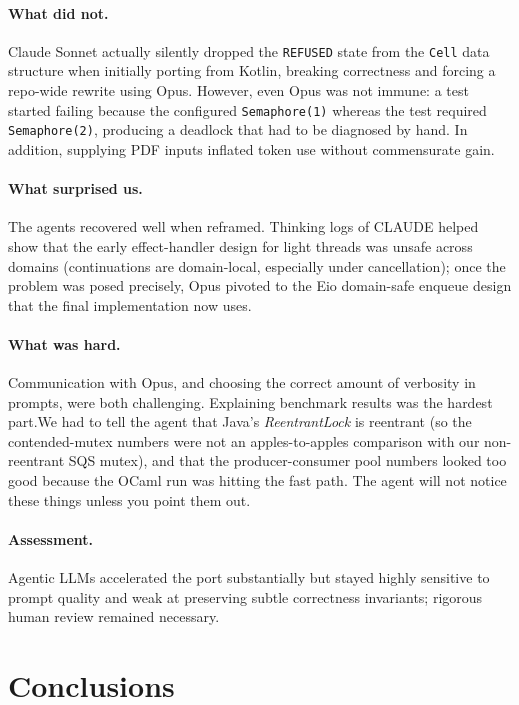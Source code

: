 \documentclass[11pt,a4paper]{article}
\begin{document}
\paragraph{What did not.} Claude Sonnet actually silently dropped the
\texttt{REFUSED} state from the \texttt{Cell} data structure when initially
porting from Kotlin, breaking correctness and forcing a repo-wide rewrite using
Opus. However, even Opus was not immune: a test started failing because the
configured \texttt{Semaphore(1)} whereas the test required
\texttt{Semaphore(2)}, producing a deadlock that had to be diagnosed by hand. In
addition, supplying PDF inputs inflated token use without commensurate gain.

\paragraph{What surprised us.} The agents recovered well when reframed. Thinking
logs of CLAUDE helped show that the early effect-handler design for light
threads was unsafe across domains (continuations are domain-local, especially
under cancellation); once the problem was posed precisely, Opus pivoted to the
Eio domain-safe enqueue design that the final implementation now uses.

\paragraph{What was hard.} Communication with Opus, and choosing the correct
amount of verbosity in prompts, were both challenging. Explaining benchmark
results was the hardest part.We had to tell the agent that Java's
\emph{ReentrantLock} is reentrant (so the contended-mutex numbers were not an
apples-to-apples comparison with our non-reentrant SQS mutex), and that the
producer-consumer pool numbers looked too good because the OCaml run was hitting
the fast path. The agent will not notice these things unless you point them out.

\paragraph{Assessment.}
Agentic LLMs accelerated the port substantially but stayed highly
sensitive to prompt quality and weak at preserving subtle correctness
invariants; rigorous human review remained necessary.

\section{Conclusions}
\label{sec:conclusions}
\end{document}
